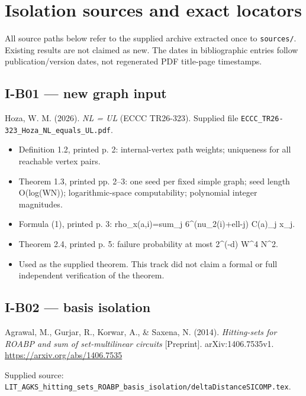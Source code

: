 \documentclass[11pt,a4paper]{article}
\providecommand{\tightlist}{\setlength{\itemsep}{0pt}\setlength{\parskip}{0pt}}
\theoremstyle{definition}\newtheorem{definition}{Definition}
\begin{document}
\section{Isolation sources and exact
locators}\label{isolation-sources-and-exact-locators}

All source paths below refer to the supplied archive extracted once to
\nolinkurl{sources/}. Existing results are not claimed as new. The dates in
bibliographic entries follow publication/version dates, not regenerated
PDF title-page timestamps.

\subsection{I-B01 --- new graph input}\label{i-b01--new-graph-input}

Hoza, W. M. (2026). \emph{NL = UL} (ECCC TR26-323). Supplied file
\nolinkurl{ECCC_TR26-323_Hoza_NL_equals_UL.pdf}.

\begin{itemize}
\tightlist
\item
  Definition 1.2, printed p. 2: internal-vertex path weights; uniqueness
  for all reachable vertex pairs.
\item
  Theorem 1.3, printed pp. 2--3: one seed per fixed simple graph; seed
  length O(log(WN)); logarithmic-space computability; polynomial integer
  magnitudes.
\item
  Formula (1), printed p. 3: rho\_x(a,i)=sum\_j 6\^{}(nu\_2(i)+ell-j)
  C(a)\_j x\_j.
\item
  Theorem 2.4, printed p. 5: failure probability at most 2\^{}(-d)
  W\^{}4 N\^{}2.
\item
  Used as the supplied theorem. This track did not claim a formal or
  full independent verification of the theorem.
\end{itemize}

\subsection{I-B02 --- basis isolation}\label{i-b02--basis-isolation}

Agrawal, M., Gurjar, R., Korwar, A., \& Saxena, N. (2014).
\emph{Hitting-sets for ROABP and sum of set-multilinear circuits}
{[}Preprint{]}. arXiv:1406.7535v1. \url{https://arxiv.org/abs/1406.7535}

Supplied source:
\nolinkurl{LIT_AGKS_hitting_sets_ROABP_basis_isolation/deltaDistanceSICOMP.tex}.
\end{document}
